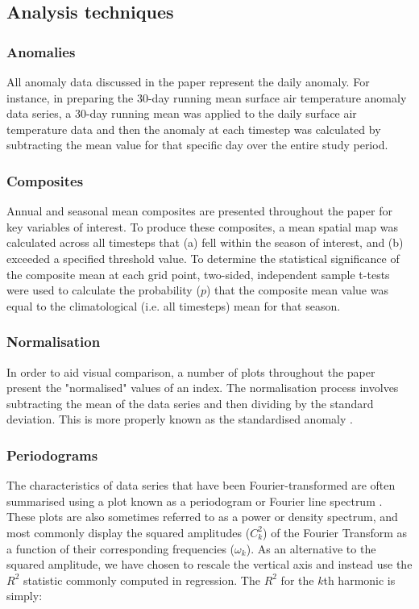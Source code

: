\subsection{Analysis techniques}

\subsubsection{Anomalies}
All anomaly data discussed in the paper represent the daily anomaly. For instance, in preparing the 30-day running mean surface air temperature anomaly data series, a 30-day running mean was applied to the daily surface air temperature data and then the anomaly at each timestep was calculated by subtracting the mean value for that specific day over the entire study period.

\subsubsection{Composites}
Annual and seasonal mean composites are presented throughout the paper for key variables of interest. To produce these composites, a mean spatial map was calculated across all timesteps that (a) fell within the season of interest, and (b) exceeded a specified threshold value. To determine the statistical significance of the composite mean at each grid point, two-sided, independent sample t-tests were used to calculate the probability ($p$) that the composite mean value was equal to the climatological (i.e. all timesteps) mean for that season.

\subsubsection{Normalisation}
In order to aid visual comparison, a number of plots throughout the paper present the "normalised" values of an index. The normalisation process involves subtracting the mean of the data series and then dividing by the standard deviation. This is more properly known as the standardised anomaly \citep{Wilks2011}. 

\subsubsection{Periodograms} %
The characteristics of data series that have been Fourier-transformed are often summarised using a plot known as a periodogram or Fourier line spectrum \citep{Wilks2011}. These plots are also sometimes referred to as a power or density spectrum, and most commonly display the squared amplitudes ($C_k^2$) of the Fourier Transform as a function of their corresponding frequencies ($\omega_k$). As an alternative to the squared amplitude, we have chosen to rescale the vertical axis and instead use the $R^2$ statistic commonly computed in regression. The $R^2$ for the $k$th harmonic is simply:

